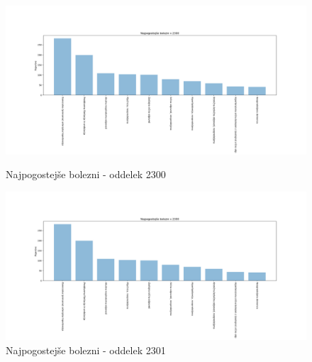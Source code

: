 \documentclass[a4paper,12pt]{report}
\begin{document}
\begin{center}
   \begin{figure}[!htb]
      \centering
         \begin{minipage}[b]{0.4\textwidth}
            \noindent\includegraphics[width=\linewidth]{./grafi/2300.png}
            \caption{Najpogostejše bolezni - oddelek 2300}
         \end{minipage}
         \hfill
         \begin{minipage}[b]{0.4\textwidth}
            \noindent\includegraphics[width=\linewidth]{./grafi/2300.png}
            \caption{Najpogostejše bolezni - oddelek 2301}
         \end{minipage}
   \end{figure}


\end{center}
\end{document}
